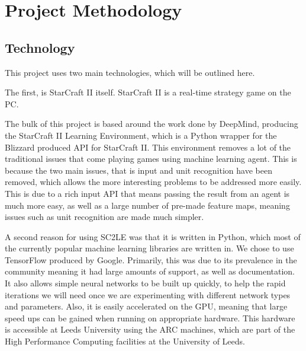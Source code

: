 \chapter{Project Methodology}%
\label{method}

\section{Technology}

This project uses two main technologies, which will be outlined here.

The first, is StarCraft II itself. StarCraft II is a real-time strategy game on
the PC\@. %

The bulk of this project is based around the work done by DeepMind, producing
the StarCraft II Learning Environment, which is a Python\cite{python-website}
wrapper for the Blizzard produced API for StarCraft II\cite{bliz-api}. This
environment removes a lot of the traditional issues that come playing
games using machine learning agent. This is because the two main issues, that
is input and unit recognition have been removed, which allows the more interesting
problems to be addressed more easily. This is due to a rich input API that means
passing the result from an agent is much more easy, as well as a large number
of pre-made feature maps, meaning issues such as unit recognition are made much
simpler.


A second reason for using SC2LE was that it is written in Python, which most
of the currently popular machine learning libraries are written in. We chose to
use TensorFlow\cite{abadi2016tensorflow} produced by Google. Primarily,
this was due to its prevalence in the community meaning it had large amounts of
support, as well as documentation. It also allows simple neural networks to be
built up quickly, to help the rapid iterations we will need once we are experimenting
with different network types and parameters. Also, it is easily accelerated on the
GPU, meaning that large speed ups can be gained when running on appropriate hardware.
This hardware is accessible at Leeds University using the ARC machines, which are
part of the High Performance Computing facilities at the University
of Leeds\cite{arc}.

